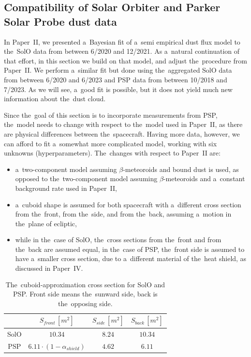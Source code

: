 \subsection{Compatibility of Solar Orbiter and Parker Solar Probe dust data}

In Paper~II, we presented a~Bayesian fit of a~semi empirical dust flux model to the~SolO data from between 6/2020 and 12/2021. As a~natural continuation of that effort, in this section we build on that model, and adjust the~procedure from Paper~II. We perform a~similar fit but done using the~aggregated SolO data from between 6/2020 and 6/2023 and PSP data from between 10/2018 and 7/2023. As we will see, a~good fit is possible, but it does not yield much new information about the~dust cloud.

Since the~goal of this section is to incorporate measurements from PSP, the~model needs to change with respect to the~model used in Paper~II, as there are physical differences between the~spacecraft. Having more data, however, we can afford to fit a~somewhat more complicated model, working with six unknowns (hyperparameters). The~changes with respect to Paper~II are:
\begin{itemize}
    \item a~two-component model assuming $\beta$-meteoroids and bound dust is used, as opposed to the~two-component model assuming $\beta$-meteoroids and a~constant background rate used in Paper~II,
    \item a~cuboid shape is assumed for both spacecraft with a~different cross section from the~front, from the~side, and from the~back, assuming a~motion in the~plane of ecliptic, 
    \item while in the~case of SolO, the~cross sections from the~front and from the~back are assumed equal, in the~case of PSP, the~front side is assumed to have a~smaller cross section, due to a~different material of the~heat shield, as discussed in Paper~IV.
\end{itemize}

\begin{table}[t]
\caption{The~cuboid-approximation cross section for SolO and PSP. Front side means the~sunward side, back is the~opposing side.}
\centering
\label{tab:cross_section}
\begin{tabular}{c|ccc}
\multicolumn{1}{p{1.2cm}}{  } \vline &  
\multicolumn{1}{p{3cm}}{ \centering $S_{front} \, [m^2]$ } & 
\multicolumn{1}{p{2cm}}{ \centering $S_{side} \, [m^2]$} & 
\multicolumn{1}{p{2cm}}{ \centering $S_{back} \, [m^2]$} \\
\hline
SolO & $10.34$ & $8.24$ & $10.34$   \\
PSP & $6.11 \cdot (1-\alpha_{shield})$ & $4.62$ & $6.11$  \\
\hline
\end{tabular}
\end{table}

